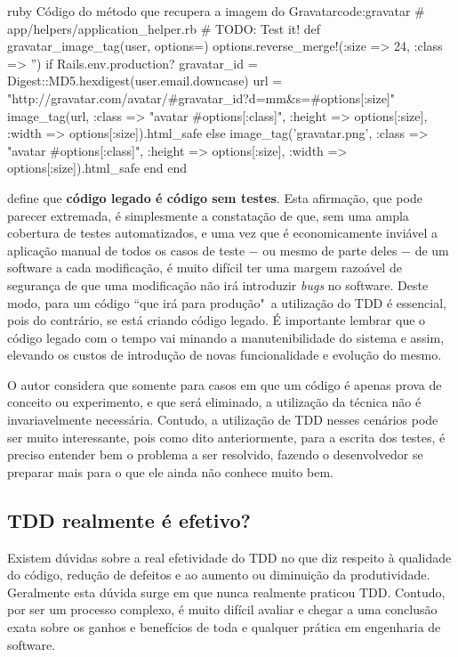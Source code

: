 \begin{mycode}{ruby}%
{Código do método que recupera a imagem do Gravatar}{code:gravatar}
# app/helpers/application_helper.rb
# TODO: Test it!
def gravatar_image_tag(user, options={})
  options.reverse_merge!(:size => 24, :class => '')
  if Rails.env.production?
    gravatar_id = Digest::MD5.hexdigest(user.email.downcase)
    url = "http://gravatar.com/avatar/#{gravatar_id}?d=mm&s=#{options[:size]}"
    image_tag(url,
              :class => "avatar #{options[:class]}",
              :height => options[:size],
              :width => options[:size]).html_safe
  else
    image_tag('gravatar.png',
              :class => "avatar #{options[:class]}",
              :height => options[:size],
              :width => options[:size]).html_safe
  end
end
\end{mycode}

 define que \textbf{código legado é código sem testes}. Esta afirmação, que pode parecer extremada, é simplesmente a constatação de que, sem uma ampla cobertura de testes automatizados, e uma vez que é economicamente inviável a aplicação manual de todos os casos de teste $-$ ou mesmo de parte deles $-$ de um software a cada modificação, é muito difícil ter uma margem razoável de segurança de que uma modificação não irá introduzir \textit{bugs} no software. Deste modo, para um código ``que irá para produção"\ a utilização do TDD é essencial, pois do contrário, se está criando código legado. É importante lembrar que o código legado com o tempo vai minando a manutenibilidade do sistema e assim, elevando os custos de introdução de novas funcionalidade e evolução do mesmo.

O autor considera que somente para casos em que um código é apenas prova de conceito ou experimento, e que será eliminado, a utilização da técnica não é invariavelmente necessária. Contudo, a utilização de TDD nesses cenários pode ser muito interessante, pois como dito anteriormente, para a escrita dos testes, é preciso entender bem o problema a ser resolvido, fazendo o desenvolvedor se preparar mais para o que ele ainda não conhece muito bem.


\subsection{TDD realmente é efetivo?} %
\label{sub:tdd_realmente_e_efetivo}

Existem dúvidas sobre a real efetividade do TDD no que diz respeito à qualidade do código, redução de defeitos e ao aumento ou diminuição da produtividade. Geralmente esta dúvida surge em que nunca realmente praticou TDD. Contudo, por ser um processo complexo, é muito difícil avaliar e chegar a uma conclusão exata sobre os ganhos e benefícios de toda e qualquer prática em engenharia de software.

